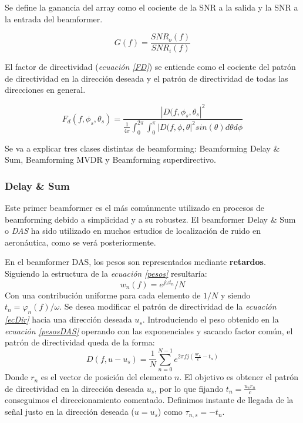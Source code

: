 \documentclass[a4paper,11pt]{book}
\begin{document}
		Se define la ganancia del array como el cociente de la SNR a la salida y la SNR a la entrada del beamformer.
		
		\begin{equation}
		G(f) = \frac{SNR_{o}(f)}{SNR_{i}(f)}
		\label{ganancia}
		\end{equation}
		
El factor de directividad (\textit{ecuación \ref{FD}}) se entiende como el cociente del patrón de directividad en la dirección deseada y el patrón de directividad de todas las direcciones en general.

\begin{equation}
F_{d}(f, \phi_{s}, \theta_{s}) = \frac{|D(f, \phi_{s}, \theta_{s}|^{2}}{\frac{1}{4 \pi} \int_{0}^{2\pi}\int_{0}^{\pi}|D(f, \phi, \theta|^{2} sin(\theta) d\theta d\phi}
\label{FD}
\end{equation}
		
				Se va a explicar tres clases distintas de beamforming: Beamforming Delay \& Sum, Beamforming MVDR y Beamforming superdirectivo.
		\subsubsection{Delay \& Sum}
		Este primer beamformer es el más comúnmente utilizado en procesos de beamforming debido a simplicidad y a su robustez. El beamformer Delay \& Sum o \textit{DAS} ha sido utilizado en muchos estudios de localización de ruido en aeronáutica, como se verá posteriormente.
		
		En el beamformer DAS, los pesos son representados mediante \textbf{retardos}. Siguiendo la estructura de la \textit{ecuación \ref{pesos}} resultaría:
		\begin{equation}
		w_{n}(f) = e^{j \omega t_{n}} / N
		\label{pesosDAS}
		\end{equation}
		Con una contribución uniforme para cada elemento de $1/N$ y siendo $t_{n} = \varphi_{n}(f) / \omega$. Se desea modificar el patrón de directividad de la \textit{ecuación \ref{ecDir}} hacia una dirección deseada $u_{s}$. Introduciendo el peso obtenido en la \textit{ecuación \ref{pesosDAS}} operando con las exponenciales y sacando factor común, el patrón de directividad queda de la forma:
\begin{equation}
		D(f, u-u_{s}) = \frac{1}{N} \sum_{n = 0}^{N-1} e^{2\pi f j (\frac{u r_{n}}{c} - t_{n})}
		\end{equation}		
		Donde $r_{n}$ es el vector de posición del elemento $n$. El objetivo es obtener el patrón de directividad en la dirección deseada $u_{s}$, por lo que fijando $t_{n} = \frac{u_{s} r_{n}}{c}$ conseguimos el direccionamiento comentado. Definimos instante de llegada de la señal justo en la dirección deseada ($u = u_{s}$) como $\tau_{n,s} = -t_{n}$. 		
		
\end{document}
